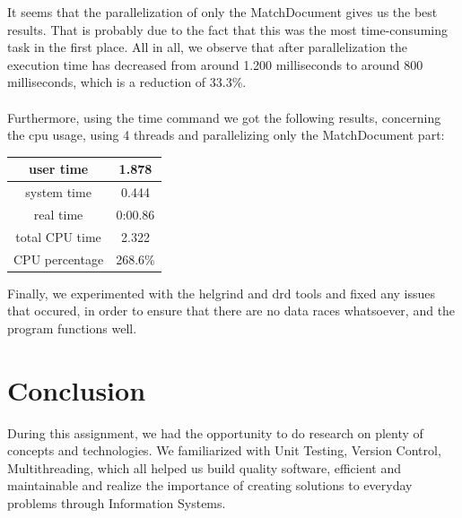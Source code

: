 \documentclass{article}
\begin{document}
It seems that the parallelization of only the MatchDocument gives us the best results. That is probably due to the fact that this was the most time-consuming task in the first place.
All in all, we observe that after parallelization the execution time has decreased from around 1.200 milliseconds to around 800 milliseconds, which is a reduction of 33.3\%.
\\ \\
Furthermore, using the time command we got the following results, concerning the cpu usage, using 4 threads and parallelizing only the MatchDocument part:
\begin{center}
\begin{tabular}{||c c||} 
 \hline
 user time & 1.878\\ 
 \hline
system time & 0.444\\
 \hline
real time & 0:00.86\\
 \hline
 total CPU time & 2.322\\
 \hline
 CPU percentage &  268.6\%\\
 \hline
\end{tabular}
\end{center}
Finally, we experimented with the helgrind and drd tools and fixed any issues that occured, in order to ensure that there are no data races whatsoever, and the program functions well.
\section{Conclusion}
During this assignment, we had the opportunity to do research on plenty of concepts and technologies. We familiarized with Unit Testing, Version Control, Multithreading, which all helped us build quality software, efficient and maintainable and realize the importance of creating solutions to everyday problems through Information Systems.
\end{document}
